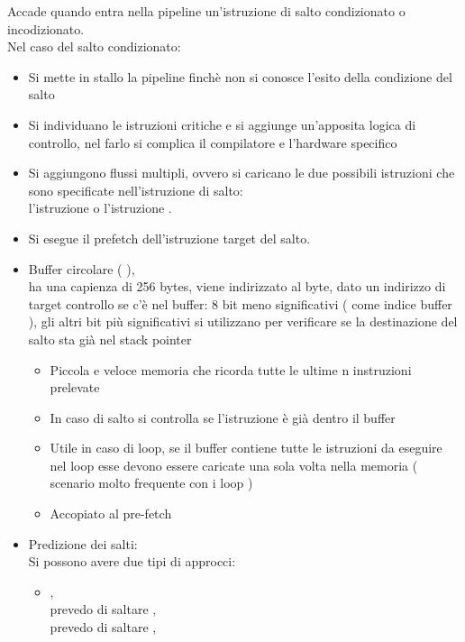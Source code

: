 \documentclass[arch.tex]{subfiles}
\begin{document}
%
\label{par:dipendenza_dal_controllo}
Accade quando entra nella pipeline un'istruzione di salto condizionato o incodizionato.\\
Nel caso del salto condizionato:

\begin{itemize}
	\item Si mette in stallo la pipeline finchè non si conosce l'esito 
		della condizione del salto
	\item Si individuano le istruzioni critiche e si aggiunge un'apposita logica
		di controllo, nel farlo si complica il compilatore e l'hardware specifico
	\item Si aggiungono flussi multipli, ovvero si caricano le due possibili istruzioni
		che sono specificate nell'istruzione di salto:\\
		l'istruzione  o l'istruzione .
	\item Si esegue il prefetch dell'istruzione target del salto.
	\item Buffer circolare (   ),\\
		ha una capienza di 256 bytes, viene indirizzato al byte, dato un indirizzo di 
		target controllo se c'è nel buffer: 8 bit meno significativi ( come indice 
		buffer ), gli altri bit più significativi si utilizzano per verificare se la 
		destinazione del salto sta già nel stack pointer
		\begin{itemize}
			\item Piccola e veloce memoria che ricorda tutte le ultime n
				instruzioni prelevate
			\item In caso di salto si controlla se l'istruzione 
				è già dentro il buffer
			\item Utile in caso di loop, se il buffer contiene tutte le istruzioni
				da eseguire nel loop esse devono essere caricate una sola 
				volta nella memoria ( scenario molto frequente con i loop )
			\item Accopiato al pre-fetch 
		\end{itemize}
	\item Predizione dei salti:\\
		Si possono avere due tipi di approcci:
		\begin{itemize}
			\item {},\\
				prevedo di saltare ,\\
				prevedo di  saltare ,\\

\end{itemize}
\end{itemize}
\end{document}
